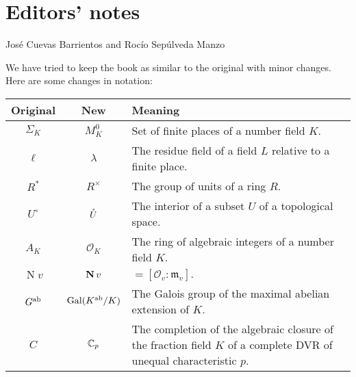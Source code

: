 \chapter*{Editors' notes}

\begin{center}
José Cuevas Barrientos and Rocío Sepúlveda Manzo
\end{center}

We have tried to keep the book as similar to the original with minor changes.
Here are some changes in notation:
\begin{longtable}{|c|c|p{9cm}|}
	\hline
	\textbf{Original} & \textbf{New} & \textbf{Meaning} \\
	\hline
	\endhead

	\hline
	\endfoot

	$\Sigma_K$ & $M_K^0$ & Set of finite places of a number field $K$. \\
	$\ell$ & $\lambda$ & The residue field of a field $L$ relative to a finite place. \\
	$R^*$ & $R^\times$ & The group of units of a ring $R$. \\
	$U^\circ$ & $\mathring{U}$ & The interior of a subset $U$ of a topological space. \\
	$A_K$ & $\mathcal{O}_K$ & The ring of algebraic integers of a number field $K$. \\
	$\operatorname{N} v$ & $\operatorname{\mathbf{N}} v$ & ${} = [\mathcal{O}_v : \mathfrak{m}_v].$ \\
	$G^{\mathrm{ab}}$ & $\operatorname{Gal}(K^{\mathrm{ab}}/K)$ & The Galois group of the maximal abelian extension of $K$. \\
	$C$ & $\mathbb{C}_p$ & The completion of the algebraic closure of the fraction field $K$ of a complete DVR of
	unequal characteristic $p$. \\
\end{longtable}


